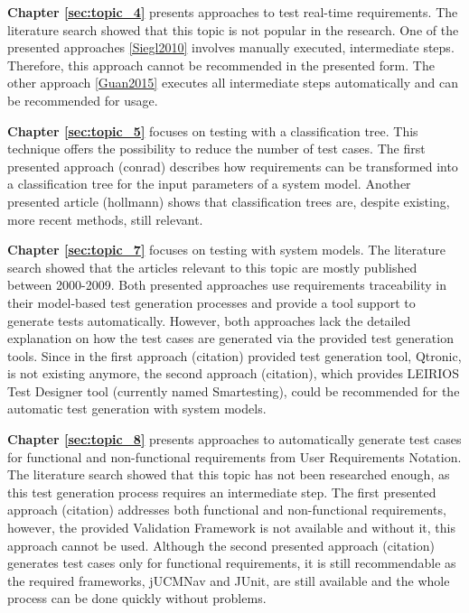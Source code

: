 \textbf{Chapter \ref{sec:topic_4}} presents approaches to test real-time requirements. The literature search showed that this topic is not popular in the research. One of the presented approaches \ref{Siegl2010} involves manually executed, intermediate steps. Therefore, this approach cannot be recommended in the presented form. The other approach \ref{Guan2015} executes all intermediate steps automatically and can be recommended for usage.

\textbf{Chapter \ref{sec:topic_5}} focuses on testing with a classification tree. This technique offers the possibility to reduce the number of test cases. The first presented approach (conrad) describes how requirements can be transformed into a classification tree for the input parameters of a system model. Another presented article (hollmann) shows that classification trees are, despite existing, more recent methods, still relevant.

\textbf{Chapter \ref{sec:topic_7}} focuses on testing with system models. The literature search showed that the articles relevant to this topic are mostly published between 2000-2009. Both presented approaches use requirements traceability in their model-based test generation processes and provide a tool support to generate tests automatically. However, both approaches lack the detailed explanation on how the test cases are generated via the provided test generation tools. Since in the first approach (citation) provided test generation tool, Qtronic, is not existing anymore, the second approach (citation), which provides LEIRIOS Test Designer tool (currently named Smartesting), could be recommended for the automatic test generation with system models.

\textbf{Chapter \ref{sec:topic_8}} presents approaches to automatically generate test cases for functional and non-functional requirements from User Requirements Notation. The literature search showed that this topic has not been researched enough, as this test generation process requires an intermediate step. The first presented approach (citation) addresses both functional and non-functional requirements, however, the provided Validation Framework is not available and without it, this approach cannot be used. Although the second presented approach (citation) generates test cases only for functional requirements, it is still recommendable as the required frameworks, jUCMNav and JUnit, are still available and the whole process can be done quickly without problems. 

